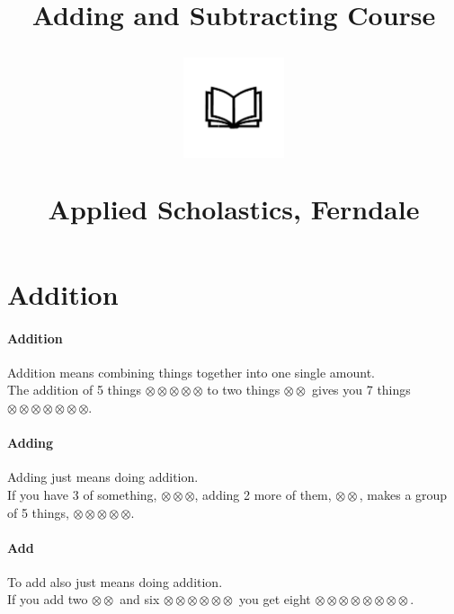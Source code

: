 \documentclass[12pt]{article}
\title{Adding and Subtracting Course\\
\begin{center}
\includegraphics[width=4em]{ApS_logo.png}
\end{center}
\begin{normalsize}Applied Scholastics, Ferndale \end{normalsize}}
\author{}
\date{}
\begin{document}
\maketitle


\section*{Addition}

\paragraph{Addition}
Addition means combining things together into one single amount.\\

The addition of 5 things $\otimes\otimes\otimes\otimes\otimes$ to two things $\otimes\otimes$ gives you 7 things $\otimes\otimes\otimes\otimes\otimes\otimes\otimes$.

\paragraph{Adding}
Adding just means doing addition.\\

If you have 3 of something, $\otimes\otimes\otimes$, adding 2 more of them, $\otimes\otimes$, makes a group of 5 things, $\otimes\otimes\otimes\otimes\otimes$.

\paragraph{Add}
To add also just means doing addition.\\

If you add two $\otimes\otimes$ and six $\otimes\otimes\otimes\otimes\otimes\otimes$ you get eight $\otimes\otimes\otimes\otimes\otimes\otimes\otimes\otimes$.
\end{document}
